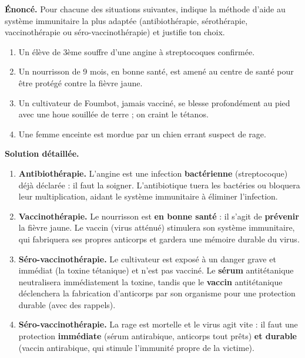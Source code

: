 \documentclass[11pt]{article}
\begin{document}
\begin{exoresolu}
\textbf{Énoncé.} Pour chacune des situations suivantes, indique la méthode d'aide au système immunitaire la plus adaptée (antibiothérapie, sérothérapie, vaccinothérapie ou séro-vaccinothérapie) et justifie ton choix.
\begin{enumerate}
\item Un élève de 3ème souffre d'une angine à streptocoques confirmée.
\item Un nourrisson de 9 mois, en bonne santé, est amené au centre de santé pour être protégé contre la fièvre jaune.
\item Un cultivateur de Foumbot, jamais vacciné, se blesse profondément au pied avec une houe souillée de terre ; on craint le tétanos.
\item Une femme enceinte est mordue par un chien errant suspect de rage.
\end{enumerate}
\tcblower
\textbf{Solution détaillée.}
\begin{enumerate}
\item \textbf{Antibiothérapie.} L'angine est une infection \textbf{bactérienne} (streptocoque) déjà déclarée : il faut la soigner. L'antibiotique tuera les bactéries ou bloquera leur multiplication, aidant le système immunitaire à éliminer l'infection.
\item \textbf{Vaccinothérapie.} Le nourrisson est \textbf{en bonne santé} : il s'agit de \textbf{prévenir} la fièvre jaune. Le vaccin (virus atténué) stimulera son système immunitaire, qui fabriquera ses propres anticorps et gardera une mémoire durable du virus.
\item \textbf{Séro-vaccinothérapie.} Le cultivateur est exposé à un danger grave et immédiat (la toxine tétanique) et n'est pas vacciné. Le \textbf{sérum} antitétanique neutralisera immédiatement la toxine, tandis que le \textbf{vaccin} antitétanique déclenchera la fabrication d'anticorps par son organisme pour une protection durable (avec des rappels).
\item \textbf{Séro-vaccinothérapie.} La rage est mortelle et le virus agit vite : il faut une protection \textbf{immédiate} (sérum antirabique, anticorps tout prêts) \textbf{et durable} (vaccin antirabique, qui stimule l'immunité propre de la victime).
\end{enumerate}
\end{exoresolu}
\end{document}
